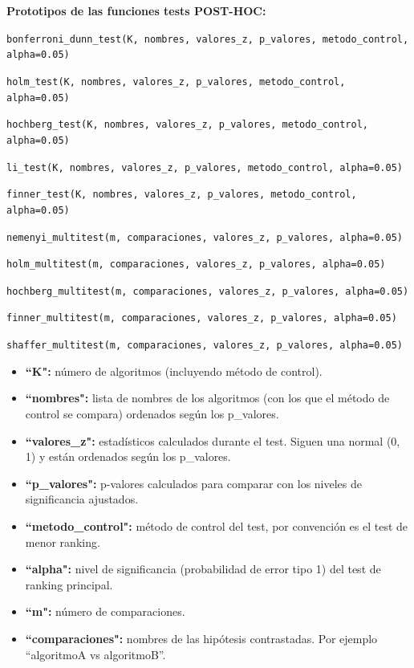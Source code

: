 \noindent
\textbf{Prototipos de las funciones tests POST-HOC:}

\texttt{bonferroni\_dunn\_test(K, nombres, valores\_z, p\_valores, metodo\_control, alpha=0.05)}

\texttt{holm\_test(K, nombres, valores\_z, p\_valores, metodo\_control, alpha=0.05)}

\texttt{hochberg\_test(K, nombres, valores\_z, p\_valores, metodo\_control, alpha=0.05)}

\texttt{li\_test(K, nombres, valores\_z, p\_valores, metodo\_control, alpha=0.05)}

\texttt{finner\_test(K, nombres, valores\_z, p\_valores, metodo\_control, alpha=0.05)}

\texttt{nemenyi\_multitest(m, comparaciones, valores\_z, p\_valores, alpha=0.05)}

\texttt{holm\_multitest(m, comparaciones, valores\_z, p\_valores, alpha=0.05)}

\texttt{hochberg\_multitest(m, comparaciones, valores\_z, p\_valores, alpha=0.05)}

\texttt{finner\_multitest(m, comparaciones, valores\_z, p\_valores, alpha=0.05)}

\texttt{shaffer\_multitest(m, comparaciones, valores\_z, p\_valores, alpha=0.05)}

\begin{itemize}
\item \textbf{``K":} número de algoritmos (incluyendo método de control).
\item \textbf{``nombres":} lista de nombres de los algoritmos (con los que el método de control se compara) ordenados según los p\_valores.
\item \textbf{``valores\_z":} estadísticos calculados durante el test. Siguen una normal (0, 1) y están ordenados según los p\_valores.
\item \textbf{``p\_valores":} p-valores calculados para comparar con los niveles de significancia ajustados.
\item \textbf{``metodo\_control":} método de control del test, por convención es el test de menor ranking.
\item \textbf{``alpha":} nivel de significancia (probabilidad de error tipo 1) del test de ranking principal.
\item \textbf{``m":} número de comparaciones.
\item \textbf{``comparaciones":} nombres de las hipótesis contrastadas. Por ejemplo “algoritmoA vs algoritmoB”.
\end{itemize}

